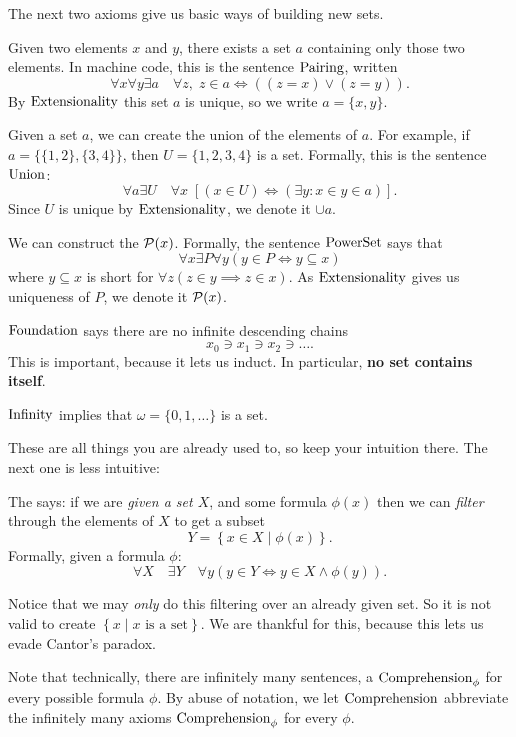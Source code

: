 The next two axioms give us basic ways of building new sets.
\begin{itemize}
	\ii Given two elements $x$ and $y$, there exists a set $a$ containing only those two elements.
	In machine code, this is the sentence $\mathrm{Pairing}$, written
	\[ \forall x \forall y \exists a \quad \forall z,
		\; z \in a \iff \left( (z=x) \lor (z=y) \right). \]
	By $\mathrm{Extensionality}$ this set $a$ is unique, so we write $a = \{x,y\}$.

	\ii Given a set $a$, we can create the union of the elements of $a$.
	For example, if $a = \{ \{1,2\}, \{3,4\} \}$, then $U = \{1,2,3,4\}$ is a set.
	Formally, this is the sentence $\mathrm{Union}$:
	\[ \forall a \exists U \quad \forall x \;
		\left[ (x \in U) \iff (\exists y : x \in y \in a) \right]. \]
	Since $U$ is unique by $\mathrm{Extensionality}$, we denote it $\cup a$.

	\ii
	We can construct the  $\mathcal P(x)$.
	Formally, the sentence $\mathrm{PowerSet}$ says that
	\[ \forall x \exists P \forall y (y \in P \iff y \subseteq x) \]
	where $y \subseteq x$ is short for $\forall z (z \in y \implies z \in x)$.
	As $\mathrm{Extensionality}$ gives us uniqueness of $P$,
	we denote it $\mathcal P(x)$.

	\ii $\mathrm{Foundation}$ says there are no infinite descending chains
	\[ x_0 \ni x_1 \ni x_2 \ni \dots. \]
	This is important, because it lets us induct.
	In particular, \textbf{no set contains itself}.

	\ii $\mathrm{Infinity}$ implies that $\omega = \{0,1,\dots\}$ is a set.
\end{itemize}
These are all things you are already used to, so keep your intuition there.
The next one is less intuitive:
\begin{itemize}
	\ii The  says:
	if we are \emph{given a set $X$}, and some formula $\phi(x)$
	then we can \emph{filter} through the elements of $X$ to get a subset
	\[ Y = \left\{ x \in X \mid \phi(x) \right\}. \]
	Formally, given a formula $\phi$:
	\[
		\forall X \quad \exists Y \quad
		\forall y (y \in Y \iff y \in X \land \phi(y)).
	\]
\end{itemize}
Notice that we may \emph{only} do this filtering over an already given set.
So it is not valid to create
$ \left\{ x \mid x \text{ is a set} \right\} $.
We are thankful for this, because this lets us evade Cantor's paradox.

\begin{abuse}
	Note that technically, there are infinitely many sentences,
	a $\mathrm{Comprehension}_\phi$ for every possible formula $\phi$.
	By abuse of notation, we let $\mathrm{Comprehension}$ abbreviate
	the infinitely many axioms $\mathrm{Comprehension}_\phi$ for every $\phi$.
\end{abuse}

